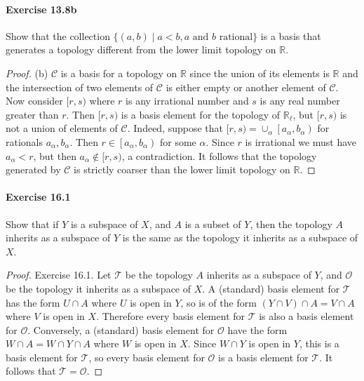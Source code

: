 \documentclass{article}
\begin{document}
\paragraph{Exercise 13.8b} Show that the collection $\{(a,b) \mid a < b, a \text{ and } b \text{ rational}\}$ is a basis that generates a topology different from the lower limit topology on $\mathbb{R}$.
\begin{proof}
    (b) $\mathcal{C}$ is a basis for a topology on $\mathbb{R}$ since the union of its elements is $\mathbb{R}$ and the intersection of two elements of $\mathcal{C}$ is either empty or another element of $\mathcal{C}$. Now consider $[r, s)$ where $r$ is any irrational number and $s$ is any real number greater than $r$. Then $[r, s)$ is a basis element for the topology of $\mathbb{R}_{\ell}$, but $[r, s)$ is not a union of elements of $\mathcal{C}$. Indeed, suppose that $[r, s)=\cup_\alpha\left[a_\alpha, b_\alpha\right)$ for rationals $a_\alpha, b_\alpha$. Then $r \in\left[a_\alpha, b_\alpha\right)$ for some $\alpha$. Since $r$ is irrational we must have $a_\alpha<r$, but then $a_\alpha \notin[r, s)$, a contradiction. It follows that the topology generated by $\mathcal{C}$ is strictly coarser than the lower limit topology on $\mathbb{R}$.
\end{proof}



\paragraph{Exercise 16.1} Show that if $Y$ is a subspace of $X$, and $A$ is a subset of $Y$, then the topology $A$ inherits as a subspace of $Y$ is the same as the topology it inherits as a subspace of $X$.
\begin{proof}
    Exercise 16.1. Let $\mathcal{T}$ be the topology $A$ inherits as a subspace of $Y$, and $\mathcal{O}$ be the topology it inherits as a subspace of $X$. A (standard) basis element for $\mathcal{T}$ has the form $U \cap A$ where $U$ is open in $Y$, so is of the form $(Y \cap V) \cap A=V \cap A$ where $V$ is open in $X$. Therefore every basis element for $\mathcal{T}$ is also a basis element for $\mathcal{O}$. Conversely, a (standard) basis element for $\mathcal{O}$ have the form $W \cap A=W \cap Y \cap A$ where $W$ is open in $X$. Since $W \cap Y$ is open in $Y$, this is a basis element for $\mathcal{T}$, so every basis element for $\mathcal{O}$ is a basis element for $\mathcal{T}$. It follows that $\mathcal{T}=\mathcal{O}$.
\end{proof}
\end{document}
